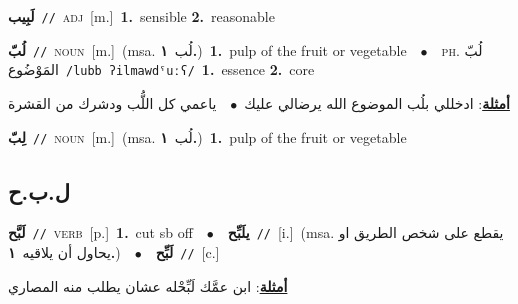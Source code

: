 \documentclass[10pt,a4paper,twoside]{article} %
\begin{document}
\begin{multicols}{2}
{{{\setlength\topsep{0pt}\textbf{\foreignlanguage{arabic}{لَبِيب}}\ {\color{gray}\texttt{//}\color{black}}\ \textsc{adj}\ [m.]\ \textbf{1.}~sensible  \textbf{2.}~reasonable\ 

{\setlength\topsep{0pt}\textbf{\foreignlanguage{arabic}{لُبّ}}\ {\color{gray}\texttt{//}\color{black}}\ \textsc{noun}\ [m.]\ \color{gray}(msa. \foreignlanguage{arabic}{لُب}~\foreignlanguage{arabic}{\textbf{١.}})\color{black}\ \textbf{1.}~pulp of the fruit or vegetable\ \ $\bullet$\ \ \textsc{ph.} \color{gray} \foreignlanguage{arabic}{لُبّ المَوْضُوع}\color{black}\ {\color{gray}\texttt{/{\sffamily lubb ʔilmawdˤuːʕ}/}\color{black}}\ \textbf{1.}~essence  \textbf{2.}~core\  \begin{flushright}\color{gray}\foreignlanguage{arabic}{\textbf{\underline{\foreignlanguage{arabic}{أمثلة}}}: ادخللي بلُب الموضوع الله يرضالي عليك\ $\bullet$\ \  ياعمي كل اللُّب ودشرك من القشرة}\end{flushright}\color{black}} \vspace{2mm}

{\setlength\topsep{0pt}\textbf{\foreignlanguage{arabic}{لِبّ}}\ {\color{gray}\texttt{//}\color{black}}\ \textsc{noun}\ [m.]\ \color{gray}(msa. \foreignlanguage{arabic}{لُب}~\foreignlanguage{arabic}{\textbf{١.}})\color{black}\ \textbf{1.}~pulp of the fruit or vegetable\ 

\vspace{-3mm}
\subsection*{\color{blue}\foreignlanguage{arabic}{ل.ب.ح}\color{blue}{}} 

{\setlength\topsep{0pt}\textbf{\foreignlanguage{arabic}{لَبَّح}}\ {\color{gray}\texttt{//}\color{black}}\ \textsc{verb}\ [p.]\ \textbf{1.}~cut sb off\ \ $\bullet$\ \ \setlength\topsep{0pt}\textbf{\foreignlanguage{arabic}{يلَبِّح}}\ {\color{gray}\texttt{//}\color{black}}\ [i.]\ \color{gray}(msa. \foreignlanguage{arabic}{يقطع على شخص الطريق او يحاول أن يلاقيه}~\foreignlanguage{arabic}{\textbf{١.}})\color{black}\ \ $\bullet$\ \ \setlength\topsep{0pt}\textbf{\foreignlanguage{arabic}{لَبِّح}}\ {\color{gray}\texttt{//}\color{black}}\ [c.]\  \begin{flushright}\color{gray}\foreignlanguage{arabic}{\textbf{\underline{\foreignlanguage{arabic}{أمثلة}}}: ابن عمَّك لَبِّحْله عشان يطلب منه المصاري}\end{flushright}\color{black}} \vspace{2mm}

}}}}
\end{multicols}
\end{document}
